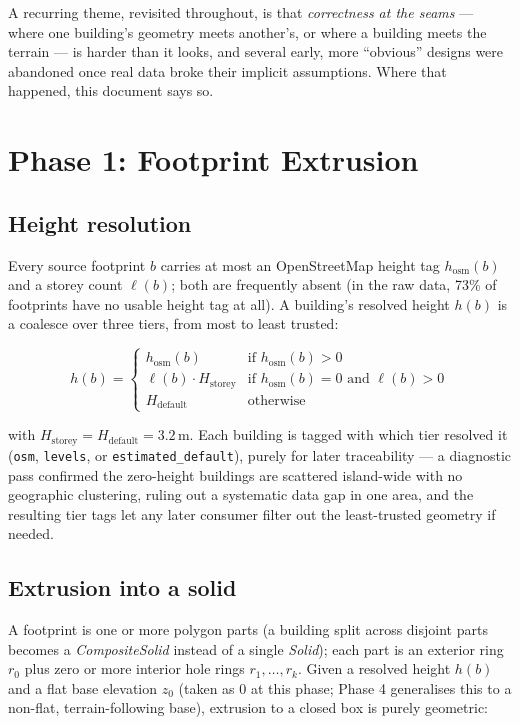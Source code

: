 \documentclass[11pt]{article}
\newcommand{\code}[1]{\texttt{#1}}
\begin{document}
A recurring theme, revisited throughout, is that \emph{correctness at the seams} --- where one
building's geometry meets another's, or where a building meets the terrain --- is harder than
it looks, and several early, more ``obvious'' designs were abandoned once real data broke
their implicit assumptions. Where that happened, this document says so.

\section{Phase 1: Footprint Extrusion}
\label{sec:extrusion}

\subsection{Height resolution}

Every source footprint $b$ carries at most an OpenStreetMap height tag $h_{\text{osm}}(b)$ and
a storey count $\ell(b)$; both are frequently absent (in the raw data, 73\% of footprints have
no usable height tag at all). A building's resolved height $h(b)$ is a coalesce over three
tiers, from most to least trusted:

\begin{equation}
  h(b) = \begin{cases}
    h_{\text{osm}}(b) & \text{if } h_{\text{osm}}(b) > 0 \\[2pt]
    \ell(b) \cdot H_{\text{storey}} & \text{if } h_{\text{osm}}(b) = 0 \text{ and } \ell(b) > 0 \\[2pt]
    H_{\text{default}} & \text{otherwise}
  \end{cases}
  \label{eq:height-coalesce}
\end{equation}

with $H_{\text{storey}} = H_{\text{default}} = 3.2$\,m. Each building is tagged with which
tier resolved it (\code{osm}, \code{levels}, or \code{estimated\_default}), purely for later
traceability --- a diagnostic pass confirmed the zero-height buildings are scattered
island-wide with no geographic clustering, ruling out a systematic data gap in one area, and
the resulting tier tags let any later consumer filter out the least-trusted geometry if
needed.

\subsection{Extrusion into a solid}

A footprint is one or more polygon parts (a building split across disjoint parts becomes a
\emph{CompositeSolid} instead of a single \emph{Solid}); each part is an exterior ring
$r_0$ plus zero or more interior hole rings $r_1, \dots, r_k$. Given a resolved height $h(b)$
and a flat base elevation $z_0$ (taken as $0$ at this phase; Phase 4 generalises this to a
non-flat, terrain-following base), extrusion to a closed box is purely geometric:
\end{document}
